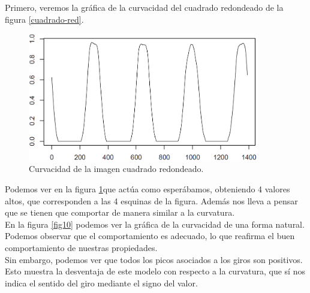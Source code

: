 Primero, veremos la gráfica de la curvacidad del cuadrado redondeado de la figura \ref{cuadrado-red}.

\begin{figure}[H]
\begin{center}
\includegraphics[width=0.9\textwidth]{img/nolin-dev3-1-limpio-0815.png}
\end{center}

\caption{Curvacidad de la imagen cuadrado redondeado.}
\label{fig9}
\end{figure}

Podemos ver en la figura \ref{fig9}que actúa como esperábamos, obteniendo 4 valores altos, que corresponden a las 4 esquinas de la figura. Además nos lleva a pensar que se tienen que comportar de manera similar a la curvatura.\\

En la figura \ref{fig10} podemos ver la gráfica de la curvacidad de una forma natural. Podemos observar que el comportamiento es adecuado, lo que reafirma el buen comportamiento de nuestras propiedades.\\

Sin embargo, podemos ver que todos los picos asociados a los giros son positivos. Esto muestra la desventaja de este modelo con respecto a la curvatura, que sí nos indica el sentido del giro mediante el signo del valor.\\

